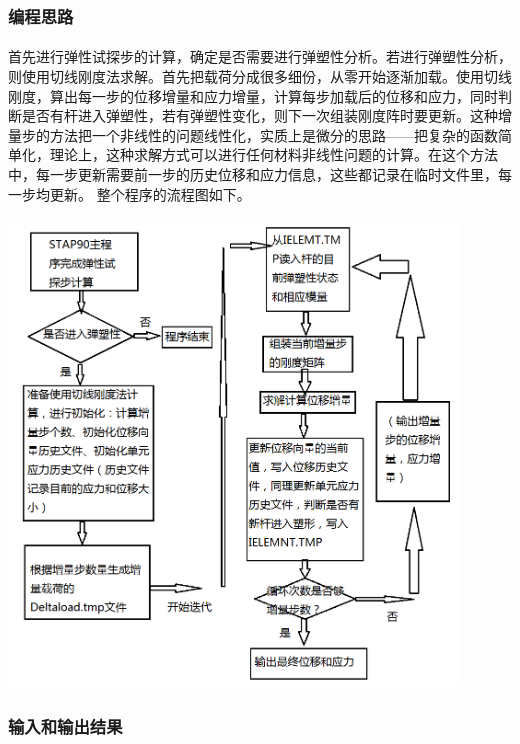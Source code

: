 \documentclass[UTF8]{ctexbook}
\begin{document}
\subsubsection{编程思路}
\paragraph{}
首先进行弹性试探步的计算，确定是否需要进行弹塑性分析。若进行弹塑性分析，则使用切线刚度法求解。首先把载荷分成很多细份，从零开始逐渐加载。使用切线刚度，算出每一步的位移增量和应力增量，计算每步加载后的位移和应力，同时判断是否有杆进入弹塑性，若有弹塑性变化，则下一次组装刚度阵时要更新。这种增量步的方法把一个非线性的问题线性化，实质上是微分的思路——把复杂的函数简单化，理论上，这种求解方式可以进行任何材料非线性问题的计算。在这个方法中，每一步更新需要前一步的历史位移和应力信息，这些都记录在临时文件里，每一步均更新。
整个程序的流程图如下。
\begin{center}
\includegraphics[width=0.9\textwidth]{plastic3.png}
\end{center}
\subsubsection{输入和输出结果}
\end{document}
